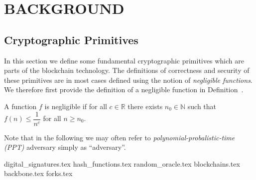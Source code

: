 \chapter{BACKGROUND}

\section{Cryptographic Primitives}
In this section we define some fundamental cryptographic primitives which are parts of the blockchain technology. The definitions of correctness and security of these primitives are in most cases defined using the notion of \emph{negligible functions}. We therefore first provide the definition of a negligible function in Definition~.

\begin{definition}
	\label{def:negligible_function}
	A function $f$ is \textsf{negligible} if for all $ c \in \mathbb{R}$ there exists $n_0 \in \mathbb{N}$ such that $f(n) \leq \dfrac{1}{n^c}$ for all $ n \geq n_0$. 
\end{definition}

Note that in the following we may often refer to \emph{polynomial-probalistic-time (PPT)} adversary simply as ``adversary''. 

{digital_signatures.tex}
{hash_functions.tex}
{random_oracle.tex}
{blockchains.tex}
{backbone.tex}
{forks.tex}